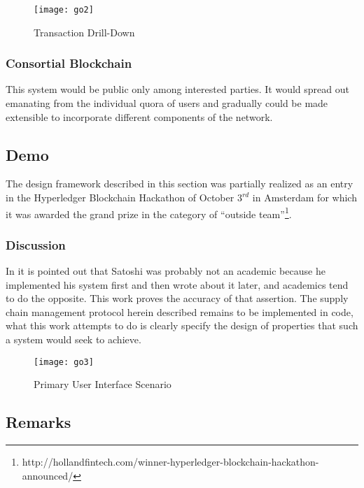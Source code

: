 \begin{figure}
  \centering
    \texttt{[image: go2]}
  \caption{Transaction Drill-Down}
\end{figure}

\subsubsection{Consortial Blockchain}

This system would be public only among interested parties.
It would spread out emanating from the individual quora of users and gradually could be made extensible to incorporate different components of the network.

\subsection{Demo}

The design framework described in this section was partially realized as an entry in the Hyperledger Blockchain Hackathon of October $3^{rd}$ in Amsterdam for which it was awarded the grand prize in the category of ``outside team''\footnote{http://hollandfintech.com/winner-hyperledger-blockchain-hackathon-announced/}. 


\subsubsection{Discussion}

In \cite{narayanan2016bitcoin} it is pointed out that Satoshi was probably not an academic because he implemented his system first and then wrote about it later, and academics tend to do the opposite. 
This work proves the accuracy of that assertion.
The supply chain management protocol herein described remains to be implemented in code, what this work attempts to do is clearly specify the design of properties that such a system would seek to achieve. 

\begin{figure}
  \centering
    \texttt{[image: go3]}
  \caption{Primary User Interface Scenario}
\end{figure}
 
\subsection*{Remarks}

